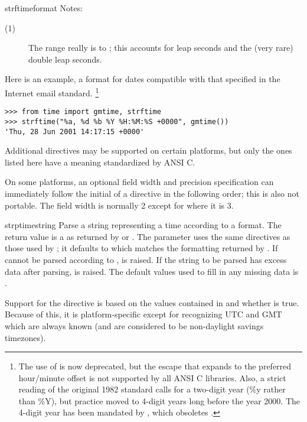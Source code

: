 \begin{funcdesc}{strftime}{format}
\noindent
Notes:

\begin{description}
  \item[(1)]
    The range really is  to ; this accounts for leap
    seconds and the (very rare) double leap seconds.
\end{description}

Here is an example, a format for dates compatible with that specified 
in the  Internet email standard.
	\footnote{The use of  is now
	deprecated, but the  escape that expands to the preferred 
	hour/minute offset is not supported by all ANSI C libraries. Also,
	a strict reading of the original 1982  standard calls for
	a two-digit year (\%y rather than \%Y), but practice moved to
	4-digit years long before the year 2000.  The 4-digit year has
        been mandated by , which obsoletes .}

\begin{verbatim}
>>> from time import gmtime, strftime
>>> strftime("%a, %d %b %Y %H:%M:%S +0000", gmtime())
'Thu, 28 Jun 2001 14:17:15 +0000'
\end{verbatim}

Additional directives may be supported on certain platforms, but
only the ones listed here have a meaning standardized by ANSI C.

On some platforms, an optional field width and precision
specification can immediately follow the initial \character{\%} of a
directive in the following order; this is also not portable.
The field width is normally 2 except for  where it is 3.
\end{funcdesc}

\begin{funcdesc}{strptime}{string}
Parse a string representing a time according to a format.  The return 
value is a  as returned by  or
.  The  parameter uses the same
directives as those used by ; it defaults to
 which matches the formatting
returned by .  If  cannot be parsed
according to ,  is raised.  If the
string to be parsed has excess data after parsing,
 is raised.  The default values used to fill in
any missing data is  .

Support for the  directive is based on the values contained in
 and whether  is true.  Because of this,
it is platform-specific except for recognizing UTC and GMT which are
always known (and are considered to be non-daylight savings
timezones).
\end{funcdesc}

